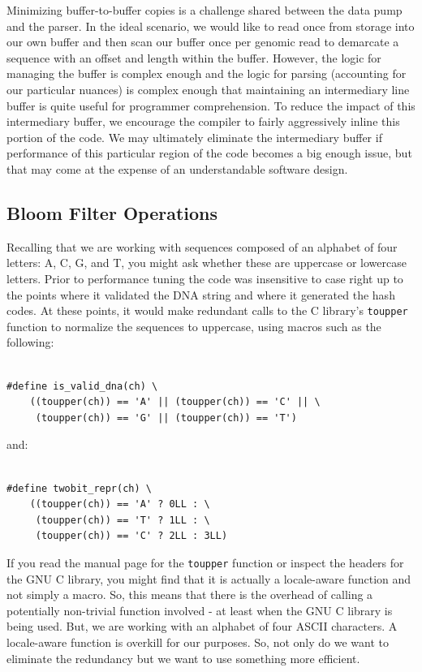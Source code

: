 \documentclass{article}
\begin{document}
Minimizing buffer-to-buffer copies is a challenge shared between the data pump
and the parser. In the ideal scenario, we would like to read once from storage
into our own buffer and then scan our buffer once per genomic read to demarcate
a sequence with an offset and length within the buffer. However, the logic for
managing the buffer is complex enough and the logic for parsing (accounting for
our particular nuances) is complex enough that maintaining an intermediary line
buffer is quite useful for programmer comprehension. To reduce the impact of
this intermediary buffer, we encourage the compiler to fairly aggressively
inline this portion of the code. We may ultimately eliminate the intermediary
buffer if performance of this particular region of the code becomes a big
enough issue, but that may come at the expense of an understandable software
design.

\subsection{Bloom Filter Operations}

Recalling that we are working with sequences composed of an alphabet of four
letters: A, C, G, and T, you might ask whether these are uppercase or lowercase
letters. Prior to performance tuning the code was insensitive to case right up
to the points where it validated the DNA string and where it generated the hash
codes. At these points, it would make redundant calls to the C library's
\texttt{toupper} function to normalize the sequences to uppercase, using macros
such as the following:

\begin{verbatim}

#define is_valid_dna(ch) \
    ((toupper(ch)) == 'A' || (toupper(ch)) == 'C' || \
     (toupper(ch)) == 'G' || (toupper(ch)) == 'T')

\end{verbatim}

and:

\begin{verbatim}

#define twobit_repr(ch) \
    ((toupper(ch)) == 'A' ? 0LL : \
     (toupper(ch)) == 'T' ? 1LL : \
     (toupper(ch)) == 'C' ? 2LL : 3LL)

\end{verbatim}

If you read the manual page for the \texttt{toupper} function or inspect the
headers for the GNU C library, you might find that it is actually a
locale-aware function and not simply a macro. So, this means that there is the
overhead of calling a potentially non-trivial function involved - at least when
the GNU C library is being used. But, we are working with an alphabet of four
ASCII characters. A locale-aware function is overkill for our purposes.  So,
not only do we want to eliminate the redundancy but we want to use something
more efficient.
\end{document}

